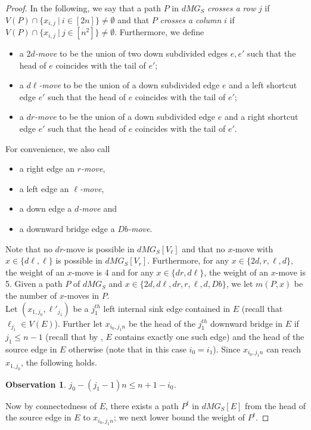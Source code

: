 \documentclass[a4paper,11pt]{article}
\theoremstyle{plain}
\newtheorem{observation}[theorem]{Observation}
\newtheorem{identification rule}{Identification Rule}
\theoremstyle{definition}
\theoremstyle{remark}
\begin{document}
\begin{proof}
In the following, we say that a path $P$ in $dMG_S$ \emph{crosses a row} $j$ if $V(P) \cap \{x_{i,j}~|~i \in [2n]\} \neq \emptyset$ and that $P$ \emph{crosses a column} $i$ if $V(P) \cap \{x_{i,j}~|~j \in [n^2]\} \neq \emptyset$. Furthermore, we define
\begin{itemize}
\item a \emph{$2d$-move} to be the union of two down subdivided edges $e,e'$ such that the head of $e$ coincides with the tail of $e'$;
\item a \emph{$d\ell$-move} to be the union of a down subdivided edge $e$ and a left shortcut edge $e'$ such that the head of $e$ coincides with the tail of $e'$;
\item a \emph{$dr$-move} to be the union of a down subdivided edge $e$ and a right shortcut edge $e'$ such that the head of $e$ coincides with the tail of $e'$. 
\end{itemize}
For convenience, we also call
\begin{itemize}
\item a right edge an \emph{$r$-move},
\item a left edge an \emph{$\ell$-move},
\item a down edge a \emph{$d$-move} and
\item a downward bridge edge a \emph{$Db$-move}.
\end{itemize}
Note that no $dr$-move is possible in $dMG_S[V_\ell]$ and that no $x$-move with $x \in \{d\ell,\ell\}$ is possible in $dMG_S[V_r]$. Furthermore, for any $x \in \{2d,r,\ell,d\}$, the weight of an $x$-move is 4 and for any $x \in \{dr,d\ell\}$, the weight of an $x$-move is 5. Given a path $P$ of $dMG_S$ and $x \in \{2d,d\ell,dr,r,\ell,d,Db\}$, we let $m(P,x)$ be the number of $x$-moves in $P$.\\

Let $(x_{1,j_0},\ell'_{j_1})$ be a $j_1^{th}$ left internal sink edge contained in $E$ (recall that $\ell_{j_1} \in V(E)$). Further let $x_{i_0,j_1n}$ be the head of the $j_1^{th}$ downward bridge in $E$ if $j_1 \leq n-1$ (recall that by , $E$ contains exactly one such edge) and the head of the source edge in $E$ otherwise (note that in this case $i_0 = i_1$). Since $x_{i_0,j_1n}$ can reach $x_{1,j_0}$, the following holds.

\begin{observation}
\label{obs:i0j0}
$j_0 - (j_1-1)n \leq n+1-i_0$.
\end{observation}

Now by connectedness of $E$, there exists a path $P^t$ in $dMG_S[E]$ from the head of the source edge in $E$ to $x_{i_0,j_1n}$; we next lower bound the weight of $P^t$.


\end{proof}
\end{document}
